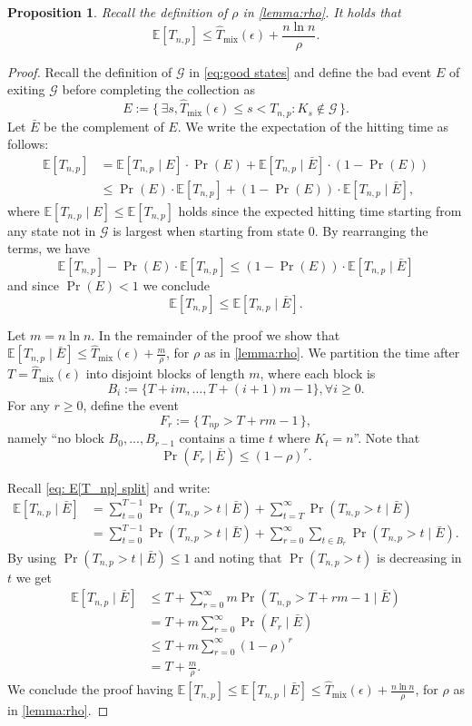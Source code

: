 \documentclass[11pt,a4paper]{article}
\newtheorem{proposition}[theorem]{Proposition}
\newcommand{\cond}{\mid}
\newcommand{\E}{\mathbb{E}}
\newcommand{\Tmar}{\hat{T}_{\mathrm{mix}}}
\begin{document}
\begin{proposition}\label{prop:unconditional upper bound E[Tnp]}
Recall the definition of $\rho$ in \cref{lemma:rho}.
It holds that
\[
    \E[T_{n,p}] \le \Tmar(\epsilon) + \frac{n \ln n}{\rho}.
\]
\end{proposition}
\begin{proof}
Recall the definition of $\mathcal{G}$ in \cref{eq:good states} and define the bad event $E$ of exiting $\mathcal{G}$ before completing the collection as
\[
    E := \{\, \exists s, \Tmar(\epsilon) \le s < T_{n,p} : K_s \not\in \mathcal{G} \,\}.
\]
Let $\bar{E}$ be the complement of $E$.
We write the expectation of the hitting time as follows:
\begin{align*}
    \E[T_{n,p}] 
    &= \E[T_{n,p} \cond E] \cdot \Pr(E) + \E[T_{n,p} \cond \bar{E}] \cdot (1 - \Pr(E))
    \\
    &\le \Pr(E) \cdot \E[T_{n,p}] + (1-\Pr(E)) \cdot \E[T_{n,p} \cond \bar{E}],
\end{align*}
where $\E[T_{n,p} \cond E] \le \E[T_{n,p}]$ holds since the expected hitting time starting from any state not in $\mathcal{G}$ is largest when starting from state 0.
By rearranging the terms, we have
\[
    \E[T_{n,p}] - \Pr(E)\cdot\E[T_{n,p}] \le (1-\Pr(E)) \cdot \E[T_{n,p} \cond \bar{E}]
\]
and since $\Pr(E) < 1$ we conclude
\[
    \E[T_{n,p}] \le \E[T_{n,p} \cond \bar{E}].
\]

Let $m = n \ln n$. 
In the remainder of the proof we show that 
$\E[T_{n,p} \cond \bar{E}] \le \Tmar(\epsilon) + \frac{m}{\rho}$, for $\rho$ as in \cref{lemma:rho}.
We partition the time after $T=\Tmar(\epsilon)$ into disjoint blocks of length $m$, where each block is
\[
    B_i := \{T+im,\ldots,T+(i+1)m-1\}, \forall i\ge 0.
\]
For any $r \ge 0$, define the event
\[
    F_r := \{\, T_{np} > T+rm-1 \,\},
\]
namely ``no block $B_0,...,B_{r-1}$ contains a time $t$ where $K_t=n$''.
Note that
\[
    \Pr(F_r \cond \bar{E}) \le (1-\rho)^r.
\]

Recall \cref{eq: E[T_np] split} and write:
\begin{align*}
    \E[T_{n,p} \cond \bar{E}] 
    &= \sum_{t=0}^{T-1} \Pr(T_{n,p} > t \cond \bar{E}) + \sum_{t=T}^{\infty}\Pr(T_{n,p} > t \cond \bar{E})
    \\
    &= \sum_{t=0}^{T-1} \Pr(T_{n,p} > t \cond \bar{E}) + \sum_{r=0}^{\infty} \sum_{t \in B_r}\Pr(T_{n,p} > t \cond \bar{E}).
\end{align*}
By using $\Pr(T_{n,p} > t \cond \bar{E}) \le 1$ and noting that $\Pr(T_{n,p} > t)$ is decreasing in $t$ we get
\begin{align*}
    \E[T_{n,p} \cond \bar{E}] 
    &\le T + \sum_{r=0}^{\infty} m \Pr(T_{n,p} > T + rm - 1 \cond \bar{E})
    \\
    &= T + m\sum_{r=0}^{\infty} \Pr(F_r \cond \bar{E})
    \\
    &\le T + m\sum_{r=0}^{\infty} (1-\rho)^r
    \\
    &= T + \frac{m}{\rho}.
\end{align*}
We conclude the proof having $\E[T_{n,p}] \le \E[T_{n,p} \cond \bar{E}] \le \Tmar(\epsilon) + \frac{n \ln n}{\rho}$, for $\rho$ as in \cref{lemma:rho}.
\end{proof}
\end{document}
